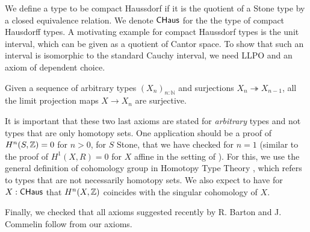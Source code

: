 \documentclass{../util/zariski}
\begin{document}
We define a type to be compact Haussdorf if it is the quotient of a Stone type by a closed equivalence relation. 
We denote $\mathsf{CHaus}$ for the the type of compact Hausdorff types. 
A motivating example for compact Haussdorf types is the unit interval, which can be given as a quotient of Cantor space. 
To show that such an interval is isomorphic to the standard Cauchy interval, 
we need LLPO and an axiom of dependent choice. 
\begin{axiom}
  Given a sequence of arbitrary types $(X_n)_{n:\mathbb N}$ and surjections $X_n \twoheadrightarrow X_{n-1}$, 
  all the limit projection maps $X \to X_n$ are surjective. 
\end{axiom}


It is important that these two last axioms are stated for {\em arbitrary} types and not types that are only
homotopy sets. One application should be a proof of $H^n(S,\mathbb{Z}) = 0$ for $n>0$, for $S$ Stone,
that we have checked for $n = 1$ (similar to the proof of $H^1(X,R) = 0$ for $X$ affine in the setting of \cite{draft}).
For this, we use the general definition of cohomology group in Homotopy Type Theory \cite{hott}, which refers to
types that are not necessarily homotopy sets.
We also expect to have for $X:\mathsf{CHaus}$ that $H^n(X,\mathbb{Z})$ coincides with the singular cohomology of $X$.

 Finally, we checked that all axioms suggested recently by R. Barton and J. Commelin \cite{bc24} follow from our axioms.





\printbibliography
\end{document}
